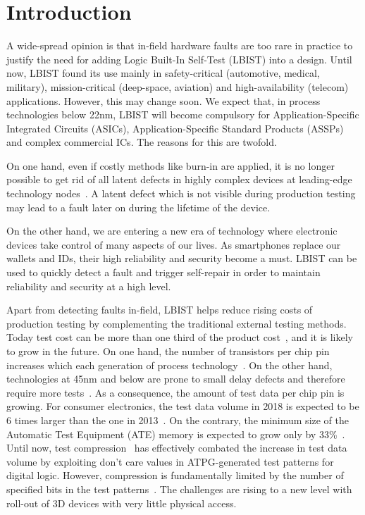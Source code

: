 \documentclass[conference]{IEEEtran}
\begin{document}
\section{Introduction}  

A wide-spread opinion is that in-field hardware faults are too rare in practice to justify the need for adding Logic Built-In Self-Test (LBIST) into a design.
Until now, LBIST found its use mainly in safety-critical (automotive, medical, military),
mission-critical (deep-space, aviation) and high-availability (telecom) applications.
However, this may change soon. We expect that, in process technologies below 22nm, LBIST will become 
compulsory for Application-Specific Integrated Circuits (ASICs), Application-Specific Standard Products (ASSPs) and complex commercial ICs. The reasons for this are twofold.

On one hand, even if costly methods like burn-in are applied, 
it is no longer possible to get rid of all latent defects in highly complex devices at leading-edge technology nodes~\cite{ITRS}. A latent defect which is not visible during production testing may lead to a fault later on during the lifetime of the device. 

On the other hand, we are entering a new era of technology where electronic devices take control of many aspects of our lives. As smartphones replace our wallets and IDs, their high reliability and security become a must. LBIST can be used to quickly detect a fault and trigger self-repair in order to maintain reliability and security at a high level. 

Apart from detecting faults in-field, LBIST helps reduce rising costs of production testing by complementing the traditional external testing methods.
Today test cost can be more than one third of the product cost~\cite{HeF99}, and it is likely to grow in the future. 
On one hand, the number of transistors per chip pin increases which each generation of process technology~\cite{Mo65}. On the other hand, technologies at 45nm and below are prone to small delay defects and therefore require more tests~\cite{YiTC11}. As a consequence, the amount of test data per chip pin is growing. For consumer electronics, the test data volume in 2018 is expected to be 6 times larger than the one in 2013~\cite{ITRS}. On the contrary, the minimum size of the Automatic Test Equipment (ATE) memory is expected to grow only by 33\%~\cite{ITRS}. Until now, test compression~\cite{RaTKM04} has effectively combated the increase in test data volume by exploiting don't care values in ATPG-generated test patterns for digital logic. However, compression is fundamentally limited by the number of specified bits in the test patterns~\cite{BaT07,Wi08}. The challenges are rising to a new level with roll-out of 3D devices with very little physical access. 
\end{document}
